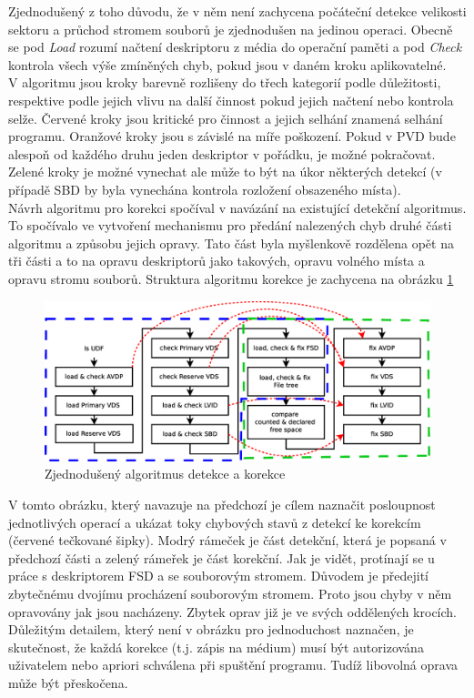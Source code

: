 Zjednodušený z toho důvodu, že v něm není zachycena počáteční detekce velikosti sektoru a průchod stromem souborů je zjednodušen na jedinou operaci. Obecně se pod \textit{Load} rozumí načtení deskriptoru z média do operační paměti a pod \textit{Check} kontrola všech výše zmíněných chyb, pokud jsou v daném kroku aplikovatelné.\\
V algoritmu jsou kroky barevně rozlišeny do třech kategorií podle důležitosti, respektive podle jejich vlivu na další činnost pokud jejich načtení nebo kontrola selže. Červené kroky jsou kritické pro činnost a jejich selhání znamená selhání programu. Oranžové kroky jsou s závislé na míře poškození. Pokud v PVD bude alespoň od každého druhu jeden deskriptor v pořádku, je možné pokračovat. Zelené kroky je možné vynechat ale může to být na úkor některých detekcí (v případě SBD by byla vynechána kontrola rozložení obsazeného místa).\\
Návrh algoritmu pro korekci spočíval v navázání na existující detekční algoritmus. To spočívalo ve vytvoření mechanismu pro předání nalezených chyb druhé části algoritmu a způsobu jejich opravy. Tato část byla myšlenkově rozdělena opět na tři části a to na opravu deskriptorů jako takových, opravu volného místa a opravu stromu souborů. Struktura algoritmu korekce je zachycena na obrázku \ref{fig:steps-korekce}
\begin{figure}[h] 
    \centering
    \includegraphics[scale=0.4]{obrazky/steps-korekce.eps}
    \caption{Zjednodušený algoritmus detekce a korekce}
    \label{fig:steps-korekce}
\end{figure}
V tomto obrázku, který navazuje na předchozí je cílem naznačit posloupnost jednotlivých operací a ukázat toky chybových stavů z detekcí ke korekcím (červené tečkované šipky). Modrý rámeček je část detekční, která je popsaná v předchozí části a zelený rámeřek je část korekční. Jak je vidět, protínají se u práce s deskriptorem FSD a se souborovým stromem. Důvodem je předejití zbytečnému dvojímu procházení souborovým stromem. Proto jsou chyby v něm opravovány jak jsou nacházeny. Zbytek oprav již je ve svých oddělených krocích.\\
Důležitým detailem, který není v obrázku pro jednoduchost naznačen, je skutečnost, že každá korekce (t.j. zápis na médium) musí být autorizována uživatelem nebo apriori schválena při spuštění programu. Tudíž libovolná oprava může být přeskočena.

